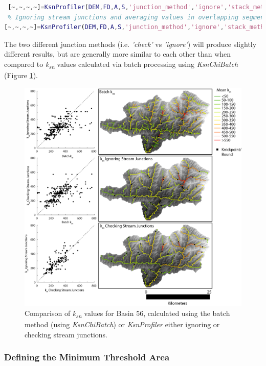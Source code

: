   \begin{lstlisting}[language=Matlab]
 % Ignoring stream junctions and stacking polylines in output shapefile:
 [~,~,~,~]=KsnProfiler(DEM,FD,A,S,'junction_method','ignore','stack_method','stack');
 % Ignoring stream junctions and averaging values in overlapping segments before producing output shapefile:
[~,~,~,~]=KsnProfiler(DEM,FD,A,S,'junction_method','ignore','stack_method','average');
 \end{lstlisting}
 
 \noindent
 The two different junction methods (i.e. \textit{'check'} vs \textit{'ignore'}) will produce slightly different results, but are generally more similar to each other than when compared to \textit{k\textsubscript{sn}} values calculated via batch processing using \textit{KsnChiBatch} (Figure \ref{fig:ProfilerComp}).

\begin{figure}[H]
	\includegraphics[width=16.5cm]{PNGs/Basin56_ksn_comparison.png}
	\caption{Comparison of \textit{k\textsubscript{sn}} values for Basin 56, calculated using the batch method (using \textit{KsnChiBatch})  or \textit{KsnProfiler} either ignoring or checking stream junctions.}
	\label{fig:ProfilerComp}
\end{figure}

\subsubsection{Defining the Minimum Threshold Area}

